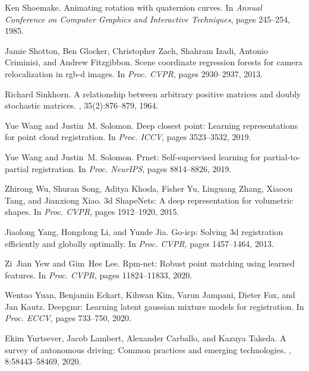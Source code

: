 \documentclass[10pt,twocolumn,letterpaper]{article}
\begin{document}
\begin{thebibliography}{10}
Ken Shoemake.
\newblock Animating rotation with quaternion curves.
\newblock In {\em Annual Conference on Computer Graphics and Interactive
  Techniques}, pages 245--254, 1985.

Jamie Shotton, Ben Glocker, Christopher Zach, Shahram Izadi, Antonio Criminisi,
  and Andrew Fitzgibbon.
\newblock Scene coordinate regression forests for camera relocalization in
  rgb-d images.
\newblock In {\em {Proc. CVPR}}, pages 2930--2937, 2013.

Richard Sinkhorn.
\newblock A relationship between arbitrary positive matrices and doubly
  stochastic matrices.
, 35(2):876--879, 1964.

Yue Wang and Justin~M. Solomon.
\newblock Deep closest point: Learning representations for point cloud
  registration.
\newblock In {\em {Proc. ICCV}}, pages 3523--3532, 2019.

Yue Wang and Justin~M. Solomon.
\newblock Prnet: Self-supervised learning for partial-to-partial registration.
\newblock In {\em {Proc. NeurIPS}}, pages 8814--8826, 2019.

Zhirong Wu, Shuran Song, Aditya Khosla, Fisher Yu, Linguang Zhang, Xiaoou Tang,
  and Jianxiong Xiao.
\newblock 3d {ShapeNets}: A deep representation for volumetric shapes.
\newblock In {\em {Proc. CVPR}}, pages 1912--1920, 2015.

Jiaolong Yang, Hongdong Li, and Yunde Jia.
\newblock Go-icp: Solving 3d registration efficiently and globally optimally.
\newblock In {\em {Proc. CVPR}}, pages 1457--1464, 2013.

Zi~Jian Yew and Gim~Hee Lee.
\newblock Rpm-net: Robust point matching using learned features.
\newblock In {\em {Proc. CVPR}}, pages 11824--11833, 2020.

Wentao Yuan, Benjamin Eckart, Kihwan Kim, Varun Jampani, Dieter Fox, and Jan
  Kautz.
\newblock Deepgmr: Learning latent gaussian mixture models for registration.
\newblock In {\em {Proc. ECCV}}, pages 733--750, 2020.

Ekim Yurtsever, Jacob Lambert, Alexander Carballo, and Kazuya Takeda.
\newblock A survey of autonomous driving: Common practices and emerging
  technologies.
, 8:58443--58469, 2020.


\end{thebibliography}
\end{document}
